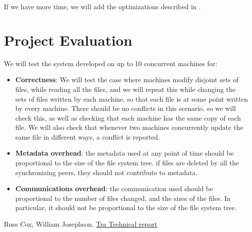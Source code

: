 \noindent If we have more time, we will add the optimizations described in \cite{tra-tech-report}.

\section{Project Evaluation}
We will test the system developed on up to 10 concurrent machines for:
\begin{itemize}\renewcommand{\labelitemi}{$\diamond$}
\item {\bf Correctness}: We will test the case where machines modify disjoint sets of files, while reading all the files, and we will repeat this while changing the sets of files written by each machine, so that each file is at some point written by every machine.  There should be no conflicts in this scenario, so we will check this, as well as checking that each machine has the same copy of each file.  We will also check that whenever two machines concurrently update the same file in different ways, a conflict is reported.

\item {\bf Metadata overhead}: the metadata used at any point of time should be proportional to the size of the file system tree. if files are deleted by all the synchronizing peers, they should not contribute to metadata.

\item {\bf Communications overhead}: the communication used should be proportional to the number of files changed, and the sizes of the files. In particular, it should not be proportional to the size of the file system tree.
\end{itemize}

\begin{thebibliography}{1}
\newblock Russ Cox, William Josephson.
\newblock \href{http://publications.csail.mit.edu/tmp/MIT-CSAIL-TR-2005-014.pdf}{Tra Technical report}
\end{thebibliography}

